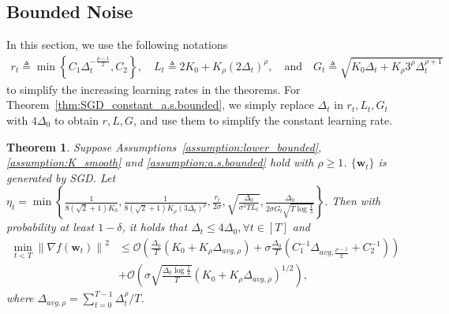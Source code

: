 \documentclass{article}
\newtheorem{theorem}{Theorem}
\newcommand{\Norm}[1]{\left\|#1\right\|}
\newcommand{\Kr}{K_{\rho}}
\newcommand{\paren}[1]{\left( #1 \right)}
\newcommand{\bw}{\mathbf{w}}
\begin{document}
\subsection{Bounded Noise}\label{sec:SGD_bounded}

In this section, we use the following notations 
\begin{align*}
    r_t\triangleq \min\left\{C_1\Delta_t^{-\frac{\rho-1}{2}},C_2\right\}, \quad L_t \triangleq 2K_0+\Kr\paren{2\Delta_t}^\rho, \quad \text{and} \quad G_t\triangleq\sqrt{K_0\Delta_t+\Kr3^\rho\Delta_t^{\rho+1}}
\end{align*}
to simplify the increasing learning rates in the theorems. 
For Theorem~\ref{thm:SGD_constant_a.s.bounded}, we simply replace $\Delta_t$ in $r_t,L_t,G_t$ with $4\Delta_0$ to obtain $r,L,G$, and use them to simplify the constant learning rate.


\begin{theorem}\label{thm:SGD_adaptive_a.s.bounded}
    Suppose Assumptions~\ref{assumption:lower_bounded}, \ref{assumption:K_smooth} and \ref{assumption:a.s.bounded} hold with $\rho\geq 1$. $\{\bw_t\}$ is generated by SGD.
    Let 
    $\eta_t=\min \left\{\frac{1}{8(\sqrt{2}+1) K_0}, \frac{1}{8(\sqrt{2}+1) K_\rho\left(3 \Delta_t\right)^\rho}, \frac{r_t}{2 \sigma}, \sqrt{\frac{\Delta_0}{\sigma^2 T L_t}}, \frac{\Delta_0}{2 \sigma G_t \sqrt{T \log \frac{1}{\delta}}}\right\}.$
    Then with probability at least $1-\delta$,
    it holds that $\Delta_t\leq 4\Delta_0,\forall t\in[T]$ and 
    \begin{align*}
        \min_{t<T}\Norm{\nabla f(\bw_t)}^2&\leq \mathcal{O}\left(\frac{\Delta_0}{T}\paren{K_0+\Kr\Delta_{avg,\rho}}+\sigma\frac{\Delta_0}{T}\paren{C_1^{-1}\Delta_{avg,\frac{\rho-1}{2}}+C_2^{-1}}\right)\\
        &+ \mathcal{O}\paren{\sigma\sqrt{\frac{\Delta_0\log\frac{1}{\delta}}{T}}\paren{K_0+\Kr\Delta_{avg,\rho}}^{1/2}},
    \end{align*}
    where $\Delta_{avg,\rho}=\sum_{t=0}^{T-1}\Delta_t^\rho/T$.
    \end{theorem}
\end{document}

